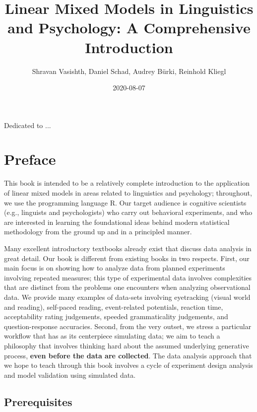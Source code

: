 \documentclass[12pt,]{krantz}
\title{Linear Mixed Models in Linguistics and Psychology: A Comprehensive Introduction}
\author{Shravan Vasishth, Daniel Schad, Audrey Bürki, Reinhold Kliegl}
\date{2020-08-07}
\begin{document}
\maketitle

\thispagestyle{empty}
\begin{center}
Dedicated to ...
\end{center}

\setlength{\abovedisplayskip}{-5pt}
\setlength{\abovedisplayshortskip}{-5pt}

{
\hypersetup{linkcolor=}
\setcounter{tocdepth}{2}
\tableofcontents
}
\hypertarget{preface}{%
\chapter*{Preface}\label{preface}}


This book is intended to be a relatively complete introduction to the application of linear mixed models in areas related to linguistics and psychology; throughout, we use the programming language R. Our target audience is cognitive scientists (e.g., linguists and psychologists) who carry out behavioral experiments, and who are interested in learning the foundational ideas behind modern statistical methodology from the ground up and in a principled manner.

Many excellent introductory textbooks already exist that discuss data analysis in great detail. Our book is different from existing books in two respects. First, our main focus is on showing how to analyze data from planned experiments involving repeated measures; this type of experimental data involves complexities that are distinct from the problems one encounters when analyzing observational data. We provide many examples of data-sets involving eyetracking (visual world and reading), self-paced reading, event-related potentials, reaction time, acceptability rating judgements, speeded grammaticality judgements, and question-response accuracies. Second, from the very outset, we stress a particular workflow that has as its centerpiece simulating data; we aim to teach a philosophy that involves thinking hard about the assumed underlying generative process, \textbf{even before the data are collected}. The data analysis approach that we hope to teach through this book involves a cycle of experiment design analysis and model validation using simulated data.

\hypertarget{prerequisites}{%
\section{Prerequisites}\label{prerequisites}}
\end{document}
